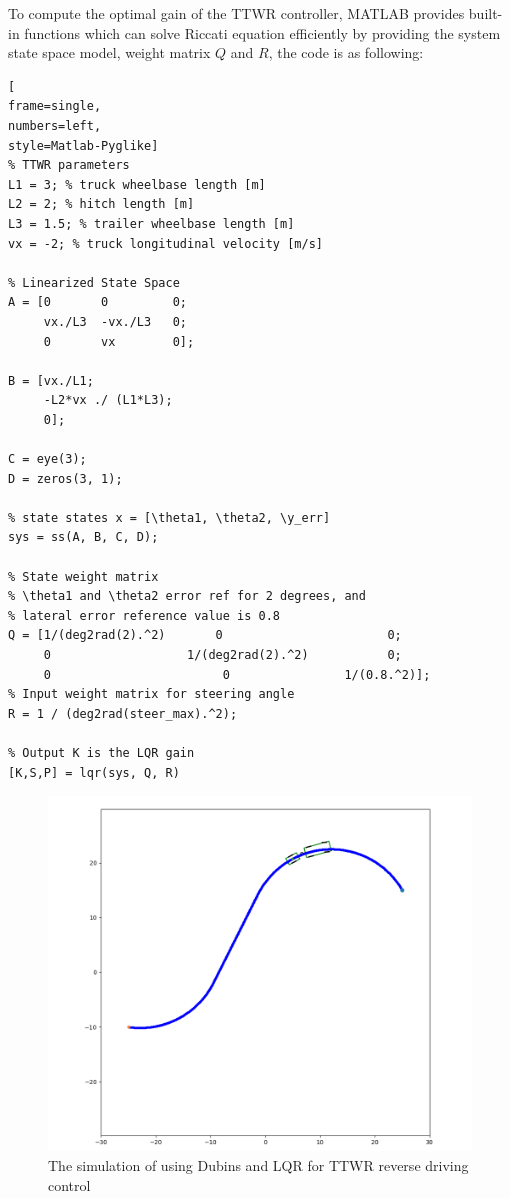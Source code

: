 To compute the optimal gain of the TTWR controller, MATLAB provides built-in functions which can solve Riccati equation efficiently by providing the system state space model, weight matrix $Q$ and $R$, the code is as following:

\begin{lstlisting}[
frame=single,
numbers=left,
style=Matlab-Pyglike]
% TTWR parameters
L1 = 3; % truck wheelbase length [m]
L2 = 2; % hitch length [m] 
L3 = 1.5; % trailer wheelbase length [m] 
vx = -2; % truck longitudinal velocity [m/s] 

% Linearized State Space
A = [0       0         0;
     vx./L3  -vx./L3   0;
     0       vx        0];

B = [vx./L1;
     -L2*vx ./ (L1*L3);
     0];

C = eye(3);
D = zeros(3, 1);

% state states x = [\theta1, \theta2, \y_err]
sys = ss(A, B, C, D);

% State weight matrix
% \theta1 and \theta2 error ref for 2 degrees, and  
% lateral error reference value is 0.8
Q = [1/(deg2rad(2).^2)       0                       0;
     0                   1/(deg2rad(2).^2)           0;
     0                        0                1/(0.8.^2)];
% Input weight matrix for steering angle
R = 1 / (deg2rad(steer_max).^2);

% Output K is the LQR gain
[K,S,P] = lqr(sys, Q, R)
\end{lstlisting}

\begin{figure}
    \centering
    \includegraphics[width=0.8\linewidth]{fig/lqr/lqr_path_following.png}
    \caption{The simulation of using Dubins and LQR for TTWR reverse driving control}
    \label{fig: simulation of using Dubins and LQR for TTWR reverse driving control}
\end{figure}

